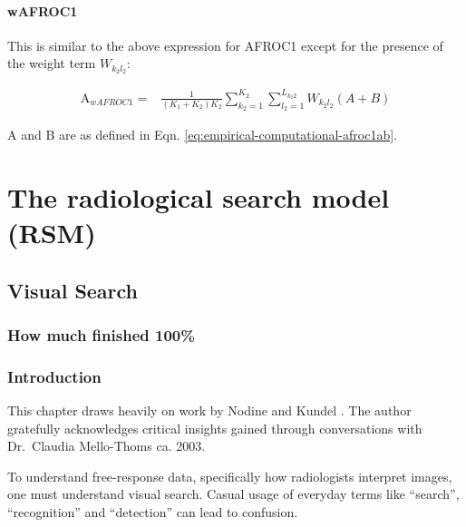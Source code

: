 \documentclass[
]{book}
\begin{document}
\hypertarget{wafroc1}{%
\subsection{wAFROC1}\label{wafroc1}}

This is similar to the above expression for AFROC1 except for the presence of the weight term \(W_{k_2l_2}\):

\begin{equation}
\begin{aligned}
\text{A}_{wAFROC1} =& \frac{1}{\left (K_1 + K_2 \right )K_2}\sum_{k_2=1}^{K_2}\sum_{l_2=1}^{L_{k_2 2}} W_{k_2l_2}\left( A+B \right)
\end{aligned}
\label{eq:empirical-computational-wafroc1}
\end{equation}

A and B are as defined in Eqn. \eqref{eq:empirical-computational-afroc1ab}.

\hypertarget{part-the-radiological-search-model-rsm}{%
\part*{The radiological search model (RSM)}\label{part-the-radiological-search-model-rsm}}

\hypertarget{visual-search}{%
\chapter{Visual Search}\label{visual-search}}

\hypertarget{visual-search-how-much-finished}{%
\section{How much finished 100\%}\label{visual-search-how-much-finished}}

\hypertarget{visual-search-intro}{%
\section{Introduction}\label{visual-search-intro}}

This chapter draws heavily on work by Nodine and Kundel \citep{nodine1987using, kundel2007holistic, kundel2004modeling, kundel1983visual, kundel1978visual}. The author gratefully acknowledges critical insights gained through conversations with Dr.~Claudia Mello-Thoms ca. 2003.

To understand free-response data, specifically how radiologists interpret images, one must understand visual search. Casual usage of everyday terms like ``search'', ``recognition'' and ``detection'' can lead to confusion.
\end{document}
